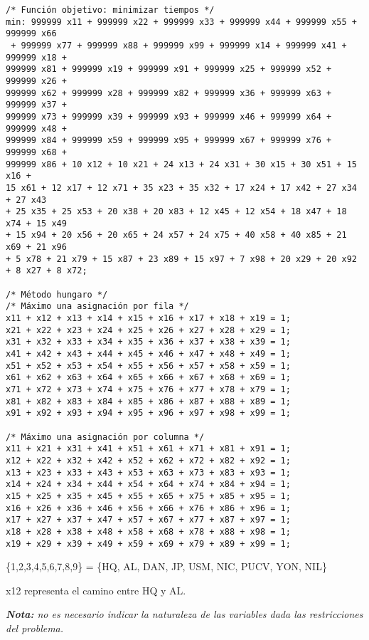 \documentclass[12pt,letterpaper]{article}
\begin{document}
\begin{verbatim}
/* Función objetivo: minimizar tiempos */
min: 999999 x11 + 999999 x22 + 999999 x33 + 999999 x44 + 999999 x55 + 999999 x66
 + 999999 x77 + 999999 x88 + 999999 x99 + 999999 x14 + 999999 x41 + 999999 x18 +
999999 x81 + 999999 x19 + 999999 x91 + 999999 x25 + 999999 x52 + 999999 x26 +
999999 x62 + 999999 x28 + 999999 x82 + 999999 x36 + 999999 x63 + 999999 x37 +
999999 x73 + 999999 x39 + 999999 x93 + 999999 x46 + 999999 x64 + 999999 x48 +
999999 x84 + 999999 x59 + 999999 x95 + 999999 x67 + 999999 x76 + 999999 x68 +
999999 x86 + 10 x12 + 10 x21 + 24 x13 + 24 x31 + 30 x15 + 30 x51 + 15 x16 +
15 x61 + 12 x17 + 12 x71 + 35 x23 + 35 x32 + 17 x24 + 17 x42 + 27 x34 + 27 x43
+ 25 x35 + 25 x53 + 20 x38 + 20 x83 + 12 x45 + 12 x54 + 18 x47 + 18 x74 + 15 x49
+ 15 x94 + 20 x56 + 20 x65 + 24 x57 + 24 x75 + 40 x58 + 40 x85 + 21 x69 + 21 x96
+ 5 x78 + 21 x79 + 15 x87 + 23 x89 + 15 x97 + 7 x98 + 20 x29 + 20 x92
+ 8 x27 + 8 x72; 

/* Método hungaro */
/* Máximo una asignación por fila */
x11 + x12 + x13 + x14 + x15 + x16 + x17 + x18 + x19 = 1;
x21 + x22 + x23 + x24 + x25 + x26 + x27 + x28 + x29 = 1;
x31 + x32 + x33 + x34 + x35 + x36 + x37 + x38 + x39 = 1;
x41 + x42 + x43 + x44 + x45 + x46 + x47 + x48 + x49 = 1;
x51 + x52 + x53 + x54 + x55 + x56 + x57 + x58 + x59 = 1;
x61 + x62 + x63 + x64 + x65 + x66 + x67 + x68 + x69 = 1;
x71 + x72 + x73 + x74 + x75 + x76 + x77 + x78 + x79 = 1;
x81 + x82 + x83 + x84 + x85 + x86 + x87 + x88 + x89 = 1;
x91 + x92 + x93 + x94 + x95 + x96 + x97 + x98 + x99 = 1;

/* Máximo una asignación por columna */
x11 + x21 + x31 + x41 + x51 + x61 + x71 + x81 + x91 = 1;
x12 + x22 + x32 + x42 + x52 + x62 + x72 + x82 + x92 = 1;
x13 + x23 + x33 + x43 + x53 + x63 + x73 + x83 + x93 = 1;
x14 + x24 + x34 + x44 + x54 + x64 + x74 + x84 + x94 = 1;
x15 + x25 + x35 + x45 + x55 + x65 + x75 + x85 + x95 = 1;
x16 + x26 + x36 + x46 + x56 + x66 + x76 + x86 + x96 = 1;
x17 + x27 + x37 + x47 + x57 + x67 + x77 + x87 + x97 = 1;
x18 + x28 + x38 + x48 + x58 + x68 + x78 + x88 + x98 = 1;
x19 + x29 + x39 + x49 + x59 + x69 + x79 + x89 + x99 = 1;
\end{verbatim}

\{1,2,3,4,5,6,7,8,9\} = \{HQ, AL, DAN, JP, USM, NIC, PUCV, YON, NIL\}

x12 representa el camino entre HQ y AL.

\textit{\textbf{Nota:} no es necesario indicar la naturaleza de las variables dada las restricciones del problema.}
\\
\end{document}
